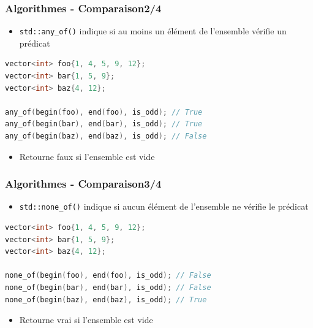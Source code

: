 \documentclass[C++.tex]{subfiles}
\begin{document}
\begin{frame}[fragile]
	\frametitle{Algorithmes - Comparaison\titlehfill{}2/4}
	\begin{itemize}
		\item \lstinline|std::any_of()| indique si au moins un élément de l'ensemble vérifie un prédicat
	\end{itemize}

	\begin{lstlisting}[language=C++]
vector<int> foo{1, 4, 5, 9, 12};
vector<int> bar{1, 5, 9};
vector<int> baz{4, 12};

any_of(begin(foo), end(foo), is_odd); // True
any_of(begin(bar), end(bar), is_odd); // True
any_of(begin(baz), end(baz), is_odd); // False\end{lstlisting}

	\begin{itemize}
		\item Retourne faux si l'ensemble est vide
	\end{itemize}
\end{frame}

\begin{frame}[fragile]
	\frametitle{Algorithmes - Comparaison\titlehfill{}3/4}
	\begin{itemize}
		\item \lstinline|std::none_of()| indique si aucun élément de l'ensemble ne vérifie le prédicat
	\end{itemize}

	\begin{lstlisting}[language=C++]
vector<int> foo{1, 4, 5, 9, 12};
vector<int> bar{1, 5, 9};
vector<int> baz{4, 12};

none_of(begin(foo), end(foo), is_odd); // False
none_of(begin(bar), end(bar), is_odd); // False
none_of(begin(baz), end(baz), is_odd); // True\end{lstlisting}

	\begin{itemize}
		\item Retourne vrai si l'ensemble est vide
	\end{itemize}
\end{frame}
\end{document}
